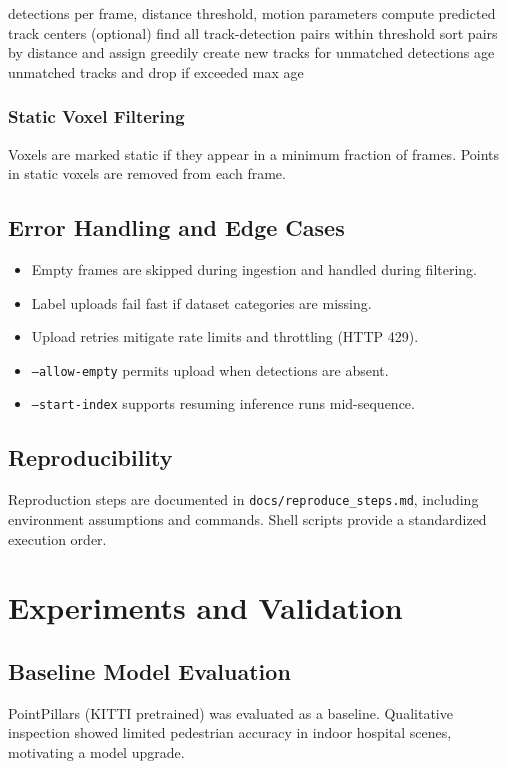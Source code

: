 \documentclass[a4paper,12pt]{report}
\begin{document}
\begin{algorithm}[H]
\caption{Greedy tracking with optional motion model}
\label{alg:tracking}
\begin{algorithmic}[1]
\Require detections per frame, distance threshold, motion parameters
  \State compute predicted track centers (optional)
  \State find all track-detection pairs within threshold
  \State sort pairs by distance and assign greedily
  \State create new tracks for unmatched detections
  \State age unmatched tracks and drop if exceeded max age
\EndFor
\end{algorithmic}
\end{algorithm}

\subsection{Static Voxel Filtering}
Voxels are marked static if they appear in a minimum fraction of frames. Points in static voxels are removed from each frame.

\section{Error Handling and Edge Cases}
\begin{itemize}
\item Empty frames are skipped during ingestion and handled during filtering.
\item Label uploads fail fast if dataset categories are missing.
\item Upload retries mitigate rate limits and throttling (HTTP 429).
\item \texttt{--allow-empty} permits upload when detections are absent.
\item \texttt{--start-index} supports resuming inference runs mid-sequence.
\end{itemize}

\section{Reproducibility}
Reproduction steps are documented in \texttt{docs/reproduce\_steps.md}, including environment assumptions and commands. Shell scripts provide a standardized execution order.

\chapter{Experiments and Validation}
\section{Baseline Model Evaluation}
PointPillars (KITTI pretrained) was evaluated as a baseline. Qualitative inspection showed limited pedestrian accuracy in indoor hospital scenes, motivating a model upgrade.
\end{document}
